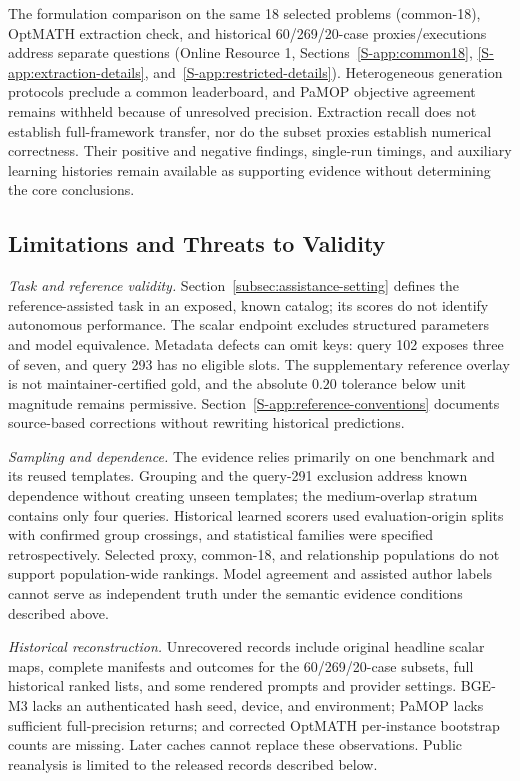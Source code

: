 \documentclass[pdflatex,iicol,sn-basic,Numbered]{sn-jnl}
\begin{document}
The formulation comparison on the same 18 selected problems (common-18), OptMATH extraction check, and historical 60/269/20-case proxies/executions address separate questions (Online Resource 1, Sections~\ref{S-app:common18}, \ref{S-app:extraction-details}, and~\ref{S-app:restricted-details}). Heterogeneous generation protocols preclude a common leaderboard, and PaMOP objective agreement remains withheld because of unresolved precision. Extraction recall does not establish full-framework transfer, nor do the subset proxies establish numerical correctness. Their positive and negative findings, single-run timings, and auxiliary learning histories remain available as supporting evidence without determining the core conclusions.

\subsection{Limitations and Threats to Validity}
\label{subsec:limitations}
\emph{Task and reference validity.} Section~\ref{subsec:assistance-setting} defines the reference-assisted task in an exposed, known catalog; its scores do not identify autonomous performance. The scalar endpoint excludes structured parameters and model equivalence. Metadata defects can omit keys: query 102 exposes three of seven, and query 293 has no eligible slots. The supplementary reference overlay is not maintainer-certified gold, and the absolute $0.20$ tolerance below unit magnitude remains permissive. Section~\ref{S-app:reference-conventions} documents source-based corrections without rewriting historical predictions.

\emph{Sampling and dependence.} The evidence relies primarily on one benchmark and its reused templates. Grouping and the query-291 exclusion address known dependence without creating unseen templates; the medium-overlap stratum contains only four queries. Historical learned scorers used evaluation-origin splits with confirmed group crossings, and statistical families were specified retrospectively. Selected proxy, common-18, and relationship populations do not support population-wide rankings. Model agreement and assisted author labels cannot serve as independent truth under the semantic evidence conditions described above.

\emph{Historical reconstruction.} Unrecovered records include original headline scalar maps, complete manifests and outcomes for the 60/269/20-case subsets, full historical ranked lists, and some rendered prompts and provider settings. BGE-M3 lacks an authenticated hash seed, device, and environment; PaMOP lacks sufficient full-precision returns; and corrected OptMATH per-instance bootstrap counts are missing. Later caches cannot replace these observations. Public reanalysis is limited to the released records described below.
\end{document}
